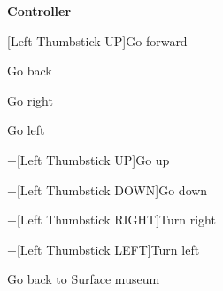 \documentclass[12pt,dvipdfmx]{article}
\begin{document}
\begin{center}

{\bf \LARGE Controller}

\end{center}

{\Large
[Left Thumbstick UP]\quad Go forward \par 
[Left Thumbstick DOWN]\quad Go back \par 
[Left Thumbstick RIGHT]\quad Go right \par 
[Left Thumbstick LEFT]\quad Go left \par 
[Left Hand Trigger]+[Left Thumbstick UP]\quad Go up \par 
[Left Hand Trigger]+[Left Thumbstick DOWN]\quad Go down \par 
[Left Hand Trigger]+[Left Thumbstick RIGHT]\quad Turn right \par 
[Left Hand Trigger]+[Left Thumbstick LEFT]\quad Turn left \par 
\bigskip\par
[Left Start]\quad Go back to Surface museum

}
\end{document}
